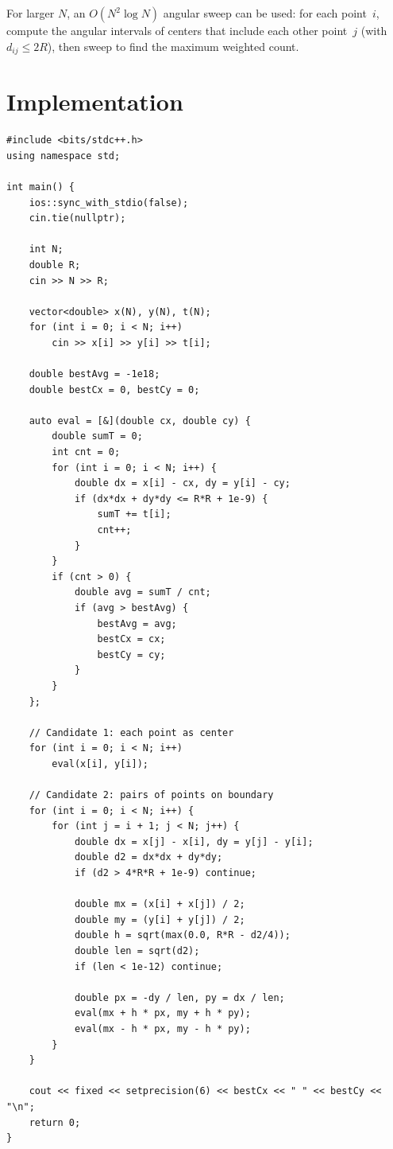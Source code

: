 \documentclass[11pt,a4paper]{article}
\begin{document}
For larger $N$, an $O(N^2 \log N)$ angular sweep can be used: for each point~$i$, compute the angular intervals of centers that include each other point~$j$ (with $d_{ij} \le 2R$), then sweep to find the maximum weighted count.

\section{Implementation}

\begin{lstlisting}
#include <bits/stdc++.h>
using namespace std;

int main() {
    ios::sync_with_stdio(false);
    cin.tie(nullptr);

    int N;
    double R;
    cin >> N >> R;

    vector<double> x(N), y(N), t(N);
    for (int i = 0; i < N; i++)
        cin >> x[i] >> y[i] >> t[i];

    double bestAvg = -1e18;
    double bestCx = 0, bestCy = 0;

    auto eval = [&](double cx, double cy) {
        double sumT = 0;
        int cnt = 0;
        for (int i = 0; i < N; i++) {
            double dx = x[i] - cx, dy = y[i] - cy;
            if (dx*dx + dy*dy <= R*R + 1e-9) {
                sumT += t[i];
                cnt++;
            }
        }
        if (cnt > 0) {
            double avg = sumT / cnt;
            if (avg > bestAvg) {
                bestAvg = avg;
                bestCx = cx;
                bestCy = cy;
            }
        }
    };

    // Candidate 1: each point as center
    for (int i = 0; i < N; i++)
        eval(x[i], y[i]);

    // Candidate 2: pairs of points on boundary
    for (int i = 0; i < N; i++) {
        for (int j = i + 1; j < N; j++) {
            double dx = x[j] - x[i], dy = y[j] - y[i];
            double d2 = dx*dx + dy*dy;
            if (d2 > 4*R*R + 1e-9) continue;

            double mx = (x[i] + x[j]) / 2;
            double my = (y[i] + y[j]) / 2;
            double h = sqrt(max(0.0, R*R - d2/4));
            double len = sqrt(d2);
            if (len < 1e-12) continue;

            double px = -dy / len, py = dx / len;
            eval(mx + h * px, my + h * py);
            eval(mx - h * px, my - h * py);
        }
    }

    cout << fixed << setprecision(6) << bestCx << " " << bestCy << "\n";
    return 0;
}
\end{lstlisting}
\end{document}
